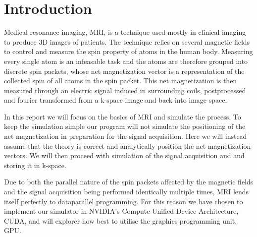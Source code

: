 \section{Introduction}


Medical resonance imaging, MRI, is a technique used mostly in clinical
imaging to produce 3D images of patients. The technique relies on
several magnetic fields to control and measure the spin property of
atoms in the human body. Measuring every single atom is an infeasable
task and the atoms are therefore grouped into discrete spin packets,
whose net magnetization vector is a representation of the collected
spin of all atoms in the spin packet. This net magnetization is then
measured through an electric signal induced in surrounding coils,
postprocessed and fourier transformed from a k-space image and back
into image space.


In this report we will focus on the basics of MRI and simulate the
process. To keep the simulation simple our program will not simulate
the positioning of the net magnetization in preparation for the signal
acquisition. Here we will instead assume that the theory is correct
and analytically position the net magnetization vectors. We will then
proceed with simulation of the signal acquisition and and storing it
in k-space.


Due to both the parallel nature of the spin packets affected by the
magnetic fields and the signal acquisition being performed identically
multiple times, MRI lends itself perfectly to dataparallel
programming. For this reason we have chosen to implement our simulator
in NVIDIA's Compute Unified Device Architecture, CUDA, and will
explorer how best to utilise the graphics programming unit, GPU.



